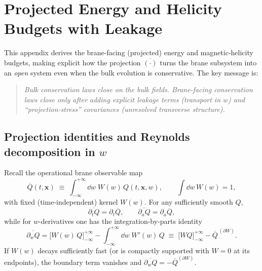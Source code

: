 \documentclass[11pt]{article}
\begin{document}
\section{Projected Energy and Helicity Budgets with Leakage}
\label{app:proj_energy_helicity}

This appendix derives the brane-facing (projected) energy and magnetic-helicity budgets,
making explicit how the projection \(\overline{(\cdot)}\) turns the brane subsystem into an
\emph{open} system even when the bulk evolution is conservative. The key message is:

\begin{quote}
\emph{Bulk conservation laws close on the bulk fields. Brane-facing conservation laws close
only after adding explicit leakage terms (transport in \(w\)) and ``projection-stress''
covariances (unresolved transverse structure).}
\end{quote}

\subsection{Projection identities and Reynolds decomposition in \(w\)}
\label{app:proj_identities}

Recall the operational brane observable map
\begin{equation}
\overline{Q}(t,\mathbf{x})
\;\equiv\;
\int_{-\infty}^{+\infty}\dd w\;W(w)\,Q(t,\mathbf{x},w),
\qquad
\int\dd w\,W(w)=1,
\label{eq:proj_def_app}
\end{equation}
with fixed (time-independent) kernel \(W(w)\). For any sufficiently smooth \(Q\),
\begin{equation}
\overline{\partial_t Q}=\partial_t \overline{Q},
\qquad
\overline{\partial_a Q}=\partial_a \overline{Q},
\label{eq:proj_commute_tx_app}
\end{equation}
while for \(w\)-derivatives one has the integration-by-parts identity
\begin{equation}
\overline{\partial_w Q}
=
\Big[W(w)\,Q\Big]_{-\infty}^{+\infty}
-
\int_{-\infty}^{+\infty}\dd w\;W'(w)\,Q
\;\equiv\;
\Big[WQ\Big]_{-\infty}^{+\infty}
-
\overline{Q}^{\,(\partial W)}.
\label{eq:proj_parts_app}
\end{equation}
If \(W(w)\) decays sufficiently fast (or is compactly supported with \(W=0\) at its
endpoints), the boundary term vanishes and \(\overline{\partial_w Q}=-\overline{Q}^{(\partial W)}\).
\end{document}
